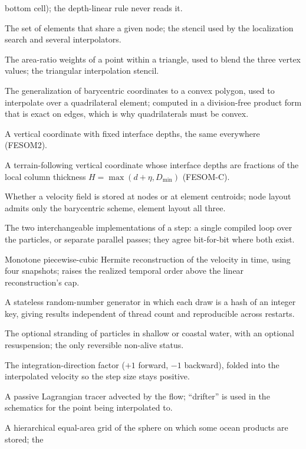 \begin{description}[style=nextline,leftmargin=0pt,font=\normalfont\bfseries]
  bottom cell); the depth-linear rule never reads it.
\item[One-ring] The set of elements that share a given node; the stencil used by the
  localization search and several interpolators.
\item[Barycentric coordinates] The area-ratio weights of a point within a triangle, used to
  blend the three vertex values; the triangular interpolation stencil.
\item[Wachspress coordinates] The generalization of barycentric coordinates to a convex
  polygon, used to interpolate over a quadrilateral element; computed in a division-free product form
  that is exact on edges, which is why quadrilaterals must be convex.
\item[z-level coordinate] A vertical coordinate with fixed interface depths, the same
  everywhere (FESOM2).
\item[Sigma coordinate] A terrain-following vertical coordinate whose interface depths are
  fractions of the local column thickness $H=\max(d+\eta,D_{\min})$ (FESOM-C).
\item[Node-layout / element-layout] Whether a velocity field is stored at nodes or at
  element centroids; node layout admits only the barycentric scheme, element layout all three.
\item[Fused / unfused kernel] The two interchangeable implementations of a step: a single
  compiled loop over the particles, or separate parallel passes; they agree bit-for-bit where both exist.
\item[PCHIP] Monotone piecewise-cubic Hermite reconstruction of the velocity in time, using
  four snapshots; raises the realized temporal order above the linear reconstruction's cap.
\item[Counter-based RNG] A stateless random-number generator in which each draw is a hash of
  an integer key, giving results independent of thread count and reproducible across restarts.
\item[Beaching] The optional stranding of particles in shallow or coastal water, with an
  optional resuspension; the only reversible non-alive status.
\item[\code{time\_dir}] The integration-direction factor ($+1$ forward, $-1$ backward),
  folded into the interpolated velocity so the step size stays positive.
\item[Drifter / particle] A passive Lagrangian tracer advected by the flow; ``drifter'' is
  used in the schematics for the point being interpolated to.
\item[HEALPix] A hierarchical equal-area grid of the sphere on which some ocean products are stored; the

\end{description}

